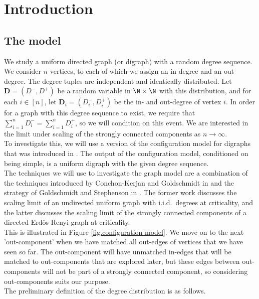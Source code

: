 \section{Introduction}
\subsection{The model}
We study a uniform directed graph (or digraph) with a random degree sequence. We consider $n$ vertices, to each of which we assign an in-degree and an out-degree. The degree tuples are independent and identically distributed. Let $\mathbf{D}=(D^-,D^+)$ be a random variable in $\N\times \N$ with this distribution, and for each $i\in [n]$, let $\mathbf{D}_i=(D^-_i,D^+_i)$  be the in- and out-degree of vertex $i$. In order for a graph with this degree sequence to exist, we require that $\sum_{i=1}^n D^-_i=\sum_{i=1}^n D^+_i$, so we will condition on this event. We are interested in the limit under scaling of the strongly connected components as $n\to \infty$.  \\
To investigate this, we will use a version of the configuration model for digraphs that was introduced in \cite{Cooper2004}. The output of the configuration model, conditioned on being simple, is a uniform digraph with the given degree sequence. \\
The techniques we will use to investigate the graph model are a combination of the techniques introduced by Conchon-Kerjan and Goldschmidt in \cite{Conchon2018} and the strategy of Goldschmidt and Stephenson in \cite{Goldschmidt2019}. The former work discusses the scaling limit of an undirected uniform graph with i.i.d.\ degrees at criticality, and the latter discusses the scaling limit of the strongly connected components of a directed Erd\H{o}s-Renyi graph at criticality.\\
 This is illustrated in Figure \ref{fig.configuration model}. We move on to the next 'out-component' when we have matched all out-edges of vertices that we have seen so far. The out-component will have unmatched in-edges that will be matched to out-components that are explored later, but these edges between out-components will not be part of a strongly connected component, so considering out-components suits our purpose. \\
The preliminary definition of the degree distribution is as follows. 
